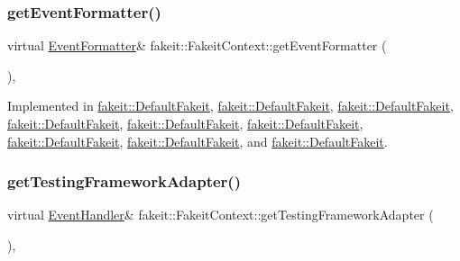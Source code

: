 \mbox{\label{structfakeit_1_1FakeitContext_a066d191292b1002025b02f6569f48b9b}} 
\subsubsection{\texorpdfstring{getEventFormatter()}{getEventFormatter()}\hspace{0.1cm}{\footnotesize\ttfamily [9/9]}}
{\footnotesize\ttfamily virtual \mbox{\hyperlink{structfakeit_1_1EventFormatter}{Event\+Formatter}}\& fakeit\+::\+Fakeit\+Context\+::get\+Event\+Formatter (\begin{DoxyParamCaption}{ }\end{DoxyParamCaption})\hspace{0.3cm}{\ttfamily [protected]}, {}}



Implemented in \mbox{\hyperlink{classfakeit_1_1DefaultFakeit_ae06b5536bcde628ed7e32499eb8b9ac3}{fakeit\+::\+Default\+Fakeit}}, \mbox{\hyperlink{classfakeit_1_1DefaultFakeit_ae06b5536bcde628ed7e32499eb8b9ac3}{fakeit\+::\+Default\+Fakeit}}, \mbox{\hyperlink{classfakeit_1_1DefaultFakeit_ae06b5536bcde628ed7e32499eb8b9ac3}{fakeit\+::\+Default\+Fakeit}}, \mbox{\hyperlink{classfakeit_1_1DefaultFakeit_ae06b5536bcde628ed7e32499eb8b9ac3}{fakeit\+::\+Default\+Fakeit}}, \mbox{\hyperlink{classfakeit_1_1DefaultFakeit_ae06b5536bcde628ed7e32499eb8b9ac3}{fakeit\+::\+Default\+Fakeit}}, \mbox{\hyperlink{classfakeit_1_1DefaultFakeit_ae06b5536bcde628ed7e32499eb8b9ac3}{fakeit\+::\+Default\+Fakeit}}, \mbox{\hyperlink{classfakeit_1_1DefaultFakeit_ae06b5536bcde628ed7e32499eb8b9ac3}{fakeit\+::\+Default\+Fakeit}}, \mbox{\hyperlink{classfakeit_1_1DefaultFakeit_ae06b5536bcde628ed7e32499eb8b9ac3}{fakeit\+::\+Default\+Fakeit}}, and \mbox{\hyperlink{classfakeit_1_1DefaultFakeit_ae06b5536bcde628ed7e32499eb8b9ac3}{fakeit\+::\+Default\+Fakeit}}.

\mbox{\label{structfakeit_1_1FakeitContext_a4be017ccd6c80cdafc02bd1985f183c8}} 
\subsubsection{\texorpdfstring{getTestingFrameworkAdapter()}{getTestingFrameworkAdapter()}\hspace{0.1cm}{\footnotesize\ttfamily [1/9]}}
{\footnotesize\ttfamily virtual \mbox{\hyperlink{structfakeit_1_1EventHandler}{Event\+Handler}}\& fakeit\+::\+Fakeit\+Context\+::get\+Testing\+Framework\+Adapter (\begin{DoxyParamCaption}{ }\end{DoxyParamCaption})\hspace{0.3cm}{\ttfamily [protected]}, {}}



